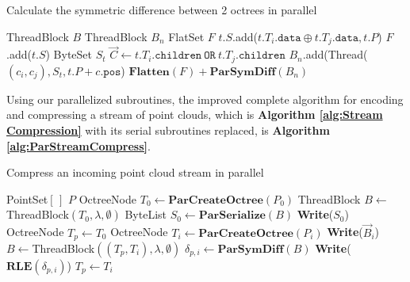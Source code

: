 \documentclass[twoside,twocolumn]{article}
\begin{document}
\begin{algorithm}[h]
\small
\caption{Calculate the symmetric difference between 2 octrees in parallel}
\label{alg:ParSymDiff}
\begin{algorithmic}[1]
 {ThreadBlock $B$}
  \State ThreadBlock $B_n$
  \State FlatSet $F$
      \State $t.S.$add($t.T_i.\mathtt{data} \oplus t.T_j.\mathtt{data}, t.P$)
      \State $F$.add($t.S$)
      \State ByteSet $S_t$
      \State $\vec{C} \gets t.T_i.\mathtt{children} \ \mathtt{OR} \ t.T_j.\mathtt{children}$
        \State $B_n.$add(Thread($(c_i, c_j), S_t, t.P + c.\mathtt{pos}$)
      \EndFor
    \EndIf
  \EndFor
  \State \Return $\mathbf{Flatten}(F) + \mathbf{ParSymDiff}(B_n)$
\EndProcedure
\Statex
\end{algorithmic}
\vspace{-0.4cm}
\end{algorithm}

Using our parallelized subroutines, the improved complete algorithm for encoding and compressing a stream
of point clouds, which is \textbf{Algorithm \ref{alg:Stream Compression}} with its serial subroutines
replaced, is \textbf{Algorithm \ref{alg:ParStreamCompress}}.

\begin{algorithm}[h]
\small
\caption{Compress an incoming point cloud stream in parallel}
\label{alg:ParStreamCompress}
\begin{algorithmic}[1]
 {PointSet$[\,]$ $P$}
  \State OctreeNode $T_0 \gets \mathbf{ParCreateOctree}(P_0)$
  \State ThreadBlock $B \gets $ThreadBlock$(T_0, \lambda, \emptyset)$
  \State ByteList $S_0 \gets \mathbf{ParSerialize}(B)$
  \State \textbf{Write}($S_0$)
  \State OctreeNode $T_p \gets T_0$
   
    \State OctreeNode $T_i \gets \mathbf{ParCreateOctree}(P_i)$
    \State \textbf{Write}($\vec{B}_i$)
    \State $B \gets $ThreadBlock$((T_p, T_i), \lambda, \emptyset)$
    \State $\delta_{p,i} \gets \mathbf{ParSymDiff}(B)$
    \State \textbf{Write}($\mathbf{RLE}(\delta_{p,i})$)
    \State $T_p \gets T_i$
  \EndFor
\EndProcedure
\Statex
\end{algorithmic}
\vspace{-0.4cm}
\end{algorithm}
\end{document}
